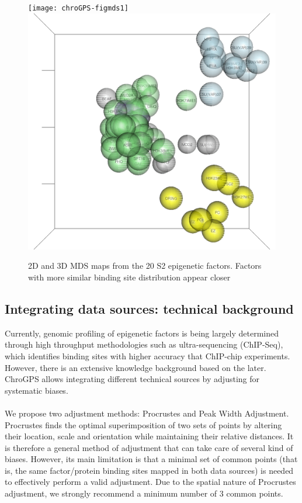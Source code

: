 \documentclass[a4paper,12pt,nogin]{article}
\newcommand{\newtext}[1]{{\color{blue} #1}} %
\begin{document}
\begin{figure}
\begin{center}
\texttt{[image: chroGPS-figmds1]}
{\includegraphics{mds3d_1.png}}
\end{center}
\caption{2D and 3D MDS maps from the 20 S2 epigenetic factors. Factors with more similar binding site distribution appear closer}
\label{fig:mds1}
\end{figure}
 
 
\subsection{Integrating data sources: technical background}
\label{ssec:tecbias}
 
Currently, genomic profiling of epigenetic factors is being largely
determined through high throughput methodologies such as
ultra-sequencing (ChIP-Seq), which identifies binding sites with higher
accuracy that ChIP-chip 
\newtext{experiments. However,}
there is an extensive
knowledge background based on the later. ChroGPS allows
integrating different technical sources by adjusting for
systematic biases.
\\\\
We propose two adjustment methods: Procrustes and Peak Width 
Adjustment. Procrustes finds the optimal superimposition of two sets of
points by altering their location, scale and orientation while
maintaining their relative distances. It is therefore a
general method of adjustment that can take care of several kind of
biases. However, its main limitation is that a minimal set of common
points (that is, the same factor/protein binding sites mapped in both data sources) is needed to effectively perform a valid adjustment. Due to the spatial nature of Procrustes adjustment, we strongly recommend a minimum number of 3 common points.
\end{document}
